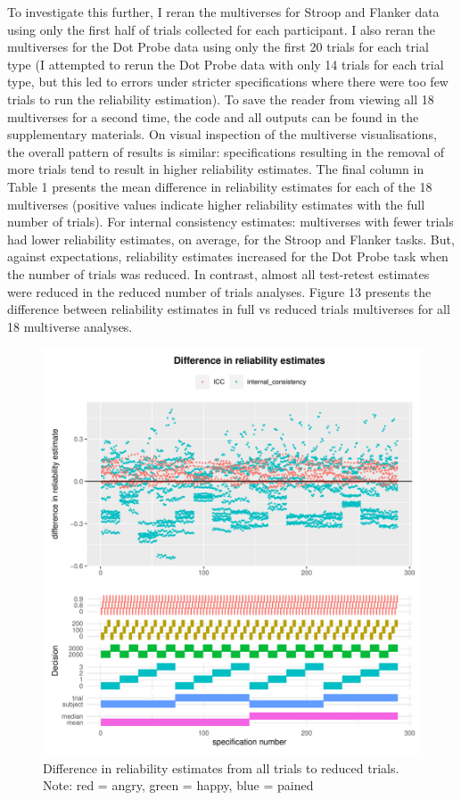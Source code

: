 \documentclass[
  english,
  man,floatsintext]{apa6}
\begin{document}
To investigate this further, I reran the multiverses for Stroop and Flanker data using only the first half of trials collected for each participant. I also reran the multiverses for the Dot Probe data using only the first 20 trials for each trial type (I attempted to rerun the Dot Probe data with only 14 trials for each trial type, but this led to errors under stricter specifications where there were too few trials to run the reliability estimation). To save the reader from viewing all 18 multiverses for a second time, the code and all outputs can be found in the supplementary materials. On visual inspection of the multiverse visualisations, the overall pattern of results is similar: specifications resulting in the removal of more trials tend to result in higher reliability estimates. The final column in Table 1 presents the mean difference in reliability estimates for each of the 18 multiverses (positive values indicate higher reliability estimates with the full number of trials). For internal consistency estimates: multiverses with fewer trials had lower reliability estimates, on average, for the Stroop and Flanker tasks. But, against expectations, reliability estimates increased for the Dot Probe task when the number of trials was reduced. In contrast, almost all test-retest estimates were reduced in the reduced number of trials analyses. Figure 13 presents the difference between reliability estimates in full vs reduced trials multiverses for all 18 multiverse analyses.

\begin{figure}
\centering
\includegraphics{Reliability_Multiverse_files/figure-latex/unnamed-chunk-18-1.pdf}
\caption{\label{fig:unnamed-chunk-18}Difference in reliability estimates from all trials to reduced trials. Note: red = angry, green = happy, blue = pained}
\end{figure}
\end{document}
